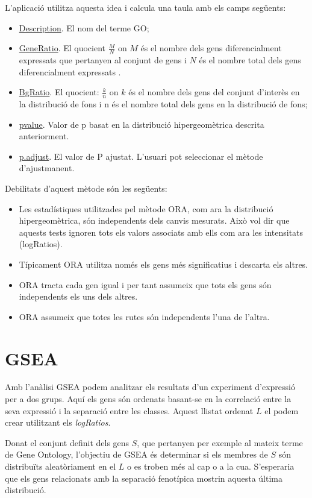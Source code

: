 L'aplicació utilitza aquesta idea i calcula una taula amb els camps següents:


\begin{itemize}
\item \underline{Description}. El nom del terme \gls{GO};
\item \underline{GeneRatio}. El quocient $\frac{M}{N}$ on $M$ és el nombre dels gens diferencialment expressats que pertanyen al conjunt de gens i $N$ és el nombre total dels gens diferencialment expressats .
\item \underline{BgRatio}. El quocient: $\frac{k}{n}$ on $k$ és el nombre dels gens del conjunt d'interès en la distribució de fons i n és el nombre total dels gens en la distribució de fons;
\item \underline{pvalue}. Valor de p basat en la distribució hipergeomètrica descrita anteriorment.
\item \underline{p.adjust}. El valor de P ajustat. L'usuari pot seleccionar el mètode d'ajustmanent.
\end{itemize}

Debilitats d'aquest mètode són les següents:
\begin{itemize}
\item Les estadístiques utilitzades pel mètode ORA, com ara la distribució hipergeomètrica, són independents dels canvis mesurats. Això vol dir que aquests tests ignoren tots els valors associats amb ells com ara les intensitats (logRatios).
\item	Típicament ORA utilitza només els gens més significatius i descarta els altres.
\item	ORA tracta cada gen igual i per tant assumeix que tots els gens són independents els uns dels altres.
\item	ORA assumeix que totes les rutes són independents l’una de l’altra.
\end{itemize}


\section{\gls{GSEA}}

Amb l'anàlisi \gls{GSEA} podem analitzar els resultats d'un experiment d'expressió per a dos grups. Aquí els gens són ordenats basant-se en la correlació entre la seva expressió i la separació entre les classes. Aquest llistat ordenat $L$ el podem crear utilitzant els \textit{\gls{logRatio}s}.

Donat el conjunt definit dels gens $S$, que pertanyen per exemple al mateix terme de Gene Ontology, l'objectiu de GSEA és determinar si els membres de $S$ són distribuïts aleatòriament en el $L$ o es troben més al cap o a la cua. S'esperaria que els gens relacionats amb la separació fenotípica mostrin aquesta última distribució. 

